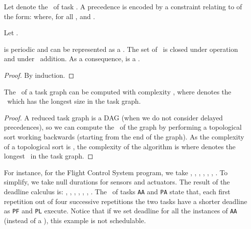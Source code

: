 Let  denote the \dword\ of task . A precedence
 is encoded by a constraint relating  to
 of the form:
 where, for
all ,  and
.

Let
.
\begin{property}
   is periodic and can be represented as a
  \dword. The set of \dwords\ is closed under operation 
  and under \dwords\ addition. As a consequence, 
  is a \dword.
\end{property}
\begin{proof}
  By induction.
\end{proof}

\begin{property}
  The \dwords\ of a task graph  can be computed with complexity
  , where  denotes the \dword\
  which has the longest size in the task graph.
\end{property}
\begin{proof}
  A reduced task graph is a DAG (when we do not consider delayed
  precedences), so we can compute the \dwords\ of the graph by
  performing a topological sort working backwards
  (starting from the end of the graph). As the complexity of a
  topological sort is , the complexity of the
  algorithm is  where  denotes
  the longest \dword\ in the task graph.
\end{proof}

For instance, for the Flight Control System program, we take ,
, , , , , .
To simplify, we take null durations for sensors and actuators. The
result of the deadline calculus is:
, ,
, ,
, ,
. The \dwords\ of tasks \lstinline!AA! and
\lstinline!PA! state that, each first repetition out of four successive
repetitions the two tasks have a shorter deadline as \lstinline!PF! and
\lstinline!PL! execute. Notice that if we set deadline  for all the
instances of \lstinline!AA! (instead of a \dword), this example is not
schedulable.


